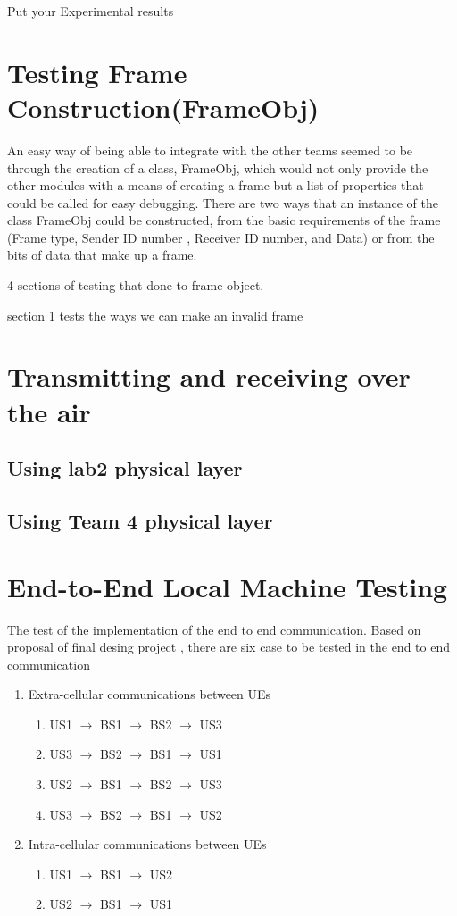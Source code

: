 
Put your Experimental results
\section{Testing Frame Construction(FrameObj)}
An easy way of being able to integrate with the other teams seemed to be through the creation of a class, FrameObj, which would not only provide the other modules with a means of creating a frame but a list of properties that could be called for easy debugging. There are two ways that an instance of the class FrameObj could be constructed,  from the basic requirements of the frame (Frame type, Sender ID number , Receiver ID number, and Data) or from the bits of data that make up a frame.

4 sections of testing that done to frame object. 

section 1 tests the ways we can make an invalid frame







\section{Transmitting and receiving over the air}
\subsection{Using lab2 physical layer}
\subsection{Using Team 4 physical layer}
\section{End-to-End Local Machine Testing }
The test of the implementation of the end to end communication.
Based on proposal of final desing project \cite{cdproj}, there
are six case to be tested in the end to end communication
\begin{enumerate}
  \item Extra-cellular communications between UEs
  \begin{enumerate}
    \item US1 $\rightarrow$ BS1 $\rightarrow$ BS2 $\rightarrow$ US3
    \item US3 $\rightarrow$ BS2 $\rightarrow$ BS1 $\rightarrow$ US1
		\item US2 $\rightarrow$ BS1 $\rightarrow$ BS2 $\rightarrow$ US3
		\item US3 $\rightarrow$ BS2 $\rightarrow$ BS1 $\rightarrow$ US2
  \end{enumerate}
  \item Intra-cellular communications between UEs
	  \begin{enumerate}
    \item US1 $\rightarrow$ BS1 $\rightarrow$ US2
    \item US2 $\rightarrow$ BS1 $\rightarrow$ US1
	\end{enumerate}
\end{enumerate}

